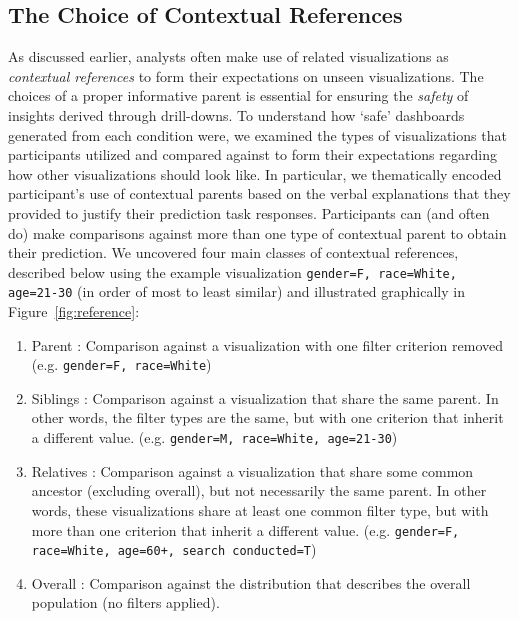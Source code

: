 \subsection{The Choice of Contextual References}
\par As discussed earlier, analysts often make use of related visualizations as \emph{contextual references} to form their expectations on unseen visualizations. The choices of a proper informative parent is essential for ensuring the \emph{safety} of insights derived through drill-downs. To understand how `safe' dashboards generated from each condition were, we examined the types of visualizations that participants utilized and compared against to form their expectations regarding how other visualizations should look like. In particular, we thematically encoded participant's use of contextual parents based on the verbal explanations that they provided to justify their prediction task responses. Participants can (and often do) make comparisons against more than one type of contextual parent to obtain their prediction. We uncovered four main classes of contextual references, described below using the example visualization \texttt{gender=F, race=White, age=21-30} (in order of most to least similar) and illustrated graphically in Figure~\ref{fig:reference}:
\begin{enumerate}
	\item Parent : Comparison against a visualization with one filter criterion removed (e.g. \texttt{gender=F, race=White})
	\item Siblings : Comparison against a visualization that share the same parent. In other words, the filter types are the same, but with one criterion that inherit a different value. (e.g. \texttt{gender=M, race=White, age=21-30})
	\item Relatives : Comparison against a visualization that share some common ancestor (excluding overall), but not necessarily the same parent. In other words, these visualizations share at least one common filter type, but with more than one criterion that inherit a different value. (e.g. \texttt{gender=F, race=White, age=60+, search conducted=T})
	\item Overall : Comparison against the distribution that describes the overall population (no filters applied).
\end{enumerate}
